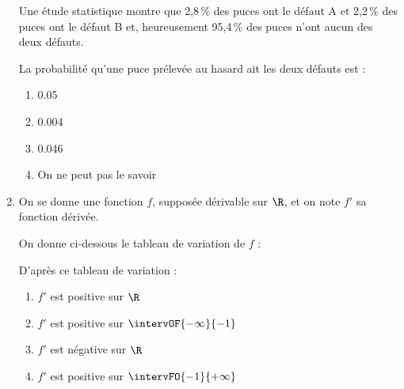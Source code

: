 \begin{enumerate}
	Une étude statistique montre que 2,8\,\% des puces ont le défaut A et 2,2\,\% des puces
	ont le défaut B et, heureusement 95,4\,\% des puces n’ont aucun des deux défauts.
	
	La probabilité qu’une puce prélevée au hasard ait les deux défauts est :
	\begin{enumerate}
		\item \num{0,05}
		\item \num{0,004}
		\item \num{0,046}
		\item On ne peut pas le savoir
	\end{enumerate}
	\item On se donne une fonction $f$, supposée dérivable sur $\R$, et on note $f'$ sa fonction
	dérivée.
	
	On donne ci-dessous le tableau de variation de $f$ :
	\begin{center}
	\end{center}
	D’après ce tableau de variation :
	\begin{enumerate}
		\item $f'$ est positive sur $\R$
		\item $f'$ est positive sur $\intervOF{-\infty}{-1}$
		\item $f'$ est négative sur $\R$
		\item $f'$ est positive sur $\intervFO{-1}{+\infty}$
	\end{enumerate}
\end{enumerate}

